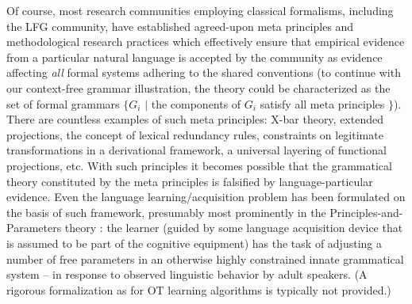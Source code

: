 \documentclass[output=paper,hidelinks]{langscibook}
\begin{document}
\begin{sloppypar}
Of course, most research communities employing classical formalisms, including the LFG community, have established agreed-upon meta principles and methodological research practices which effectively ensure that empirical evidence from a particular natural language is accepted by the community as evidence affecting \emph{all} formal systems adhering to the shared conventions (to continue with our context-free grammar illustration, the theory could be characterized as the set of formal grammars $\{ G_i$ $ | $ the components of $G_i$ satisfy all meta principles $\}$). There are countless examples of such meta principles: X-bar theory, extended projections, the concept of lexical redundancy rules, constraints on legitimate transformations in a derivational framework, a universal layering of functional projections, etc. With such principles it becomes possible that the grammatical theory constituted by the meta principles is falsified by language-particular evidence. Even the language learning/acquisition problem has been formulated on the basis of such framework, presumably most prominently in the Principles-and-Parameters theory \citep{chomsky1981lectures}: the learner (guided by some language acquisition device that is assumed to be part of the cognitive equipment) has the task of adjusting a number of free parameters in an otherwise highly constrained innate grammatical system -- in response to observed linguistic behavior by adult speakers. (A rigorous formalization as for OT learning algorithms is typically not provided.)
\end{sloppypar}
\end{document}
